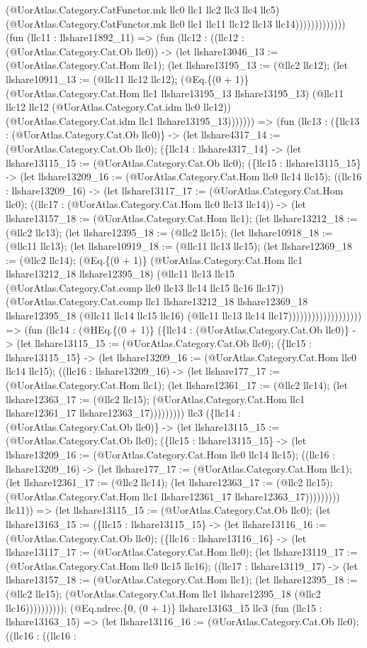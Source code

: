 \documentclass[11pt]{article}
\begin{document}
(@UorAtlas.Category.CatFunctor.mk llc0 llc1 llc2 llc3 llc4 llc5) (@UorAtlas.Category.CatFunctor.mk llc0 llc1 llc11 llc12 llc13 llc14))))))))))))) (fun (llc11 : llshare11892\_11) => (fun (llc12 : ((llc12 : (@UorAtlas.Category.Cat.Ob llc0)) -> (let llshare13046\_13 := (@UorAtlas.Category.Cat.Hom llc1); (let llshare13195\_13 := (@llc2 llc12); (let llshare10911\_13 := (@llc11 llc12 llc12); (@Eq.\{(0 + 1)\} (@UorAtlas.Category.Cat.Hom llc1 llshare13195\_13 llshare13195\_13) (@llc11 llc12 llc12 (@UorAtlas.Category.Cat.idm llc0 llc12)) (@UorAtlas.Category.Cat.idm llc1 llshare13195\_13))))))) => (fun (llc13 : (\{llc13 : (@UorAtlas.Category.Cat.Ob llc0)\} -> (let llshare4317\_14 := (@UorAtlas.Category.Cat.Ob llc0); (\{llc14 : llshare4317\_14\} -> (let llshare13115\_15 := (@UorAtlas.Category.Cat.Ob llc0); (\{llc15 : llshare13115\_15\} -> (let llshare13209\_16 := (@UorAtlas.Category.Cat.Hom llc0 llc14 llc15); ((llc16 : llshare13209\_16) -> (let llshare13117\_17 := (@UorAtlas.Category.Cat.Hom llc0); ((llc17 : (@UorAtlas.Category.Cat.Hom llc0 llc13 llc14)) -> (let llshare13157\_18 := (@UorAtlas.Category.Cat.Hom llc1); (let llshare13212\_18 := (@llc2 llc13); (let llshare12395\_18 := (@llc2 llc15); (let llshare10918\_18 := (@llc11 llc13); (let llshare10919\_18 := (@llc11 llc13 llc15); (let llshare12369\_18 := (@llc2 llc14); (@Eq.\{(0 + 1)\} (@UorAtlas.Category.Cat.Hom llc1 llshare13212\_18 llshare12395\_18) (@llc11 llc13 llc15 (@UorAtlas.Category.Cat.comp llc0 llc13 llc14 llc15 llc16 llc17)) (@UorAtlas.Category.Cat.comp llc1 llshare13212\_18 llshare12369\_18 llshare12395\_18 (@llc11 llc14 llc15 llc16) (@llc11 llc13 llc14 llc17))))))))))))))))))) => (fun (llc14 : (@HEq.\{(0 + 1)\} (\{llc14 : (@UorAtlas.Category.Cat.Ob llc0)\} -> (let llshare13115\_15 := (@UorAtlas.Category.Cat.Ob llc0); (\{llc15 : llshare13115\_15\} -> (let llshare13209\_16 := (@UorAtlas.Category.Cat.Hom llc0 llc14 llc15); ((llc16 : llshare13209\_16) -> (let llshare177\_17 := (@UorAtlas.Category.Cat.Hom llc1); (let llshare12361\_17 := (@llc2 llc14); (let llshare12363\_17 := (@llc2 llc15); (@UorAtlas.Category.Cat.Hom llc1 llshare12361\_17 llshare12363\_17))))))))) llc3 (\{llc14 : (@UorAtlas.Category.Cat.Ob llc0)\} -> (let llshare13115\_15 := (@UorAtlas.Category.Cat.Ob llc0); (\{llc15 : llshare13115\_15\} -> (let llshare13209\_16 := (@UorAtlas.Category.Cat.Hom llc0 llc14 llc15); ((llc16 : llshare13209\_16) -> (let llshare177\_17 := (@UorAtlas.Category.Cat.Hom llc1); (let llshare12361\_17 := (@llc2 llc14); (let llshare12363\_17 := (@llc2 llc15); (@UorAtlas.Category.Cat.Hom llc1 llshare12361\_17 llshare12363\_17))))))))) llc11)) => (let llshare13115\_15 := (@UorAtlas.Category.Cat.Ob llc0); (let llshare13163\_15 := (\{llc15 : llshare13115\_15\} -> (let llshare13116\_16 := (@UorAtlas.Category.Cat.Ob llc0); (\{llc16 : llshare13116\_16\} -> (let llshare13117\_17 := (@UorAtlas.Category.Cat.Hom llc0); (let llshare13119\_17 := (@UorAtlas.Category.Cat.Hom llc0 llc15 llc16); ((llc17 : llshare13119\_17) -> (let llshare13157\_18 := (@UorAtlas.Category.Cat.Hom llc1); (let llshare12395\_18 := (@llc2 llc15); (@UorAtlas.Category.Cat.Hom llc1 llshare12395\_18 (@llc2 llc16)))))))))); (@Eq.ndrec.\{0, (0 + 1)\} llshare13163\_15 llc3 (fun (llc15 : llshare13163\_15) => (let llshare13116\_16 := (@UorAtlas.Category.Cat.Ob llc0); ((llc16 : ((llc16 : 
\end{document}
